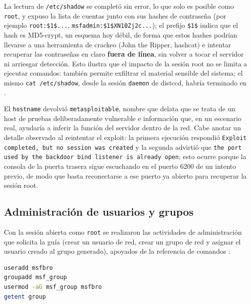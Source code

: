 \begin{analisis}
La lectura de \texttt{/etc/shadow} se completó sin error, lo que solo es posible como \texttt{root}, y expuso la lista de cuentas junto con sus hashes de contraseña (por ejemplo \texttt{root:\$1\$...}, \texttt{msfadmin:\$1\$XN10Zj2c...}); el prefijo \texttt{\$1\$} indica que el hash es MD5-crypt, un esquema hoy débil, de forma que estos hashes podrían llevarse a una herramienta de crackeo (John the Ripper, hashcat) e intentar recuperar las contraseñas en claro \textbf{fuera de línea}, sin volver a tocar el servidor ni arriesgar detección. Esto ilustra que el impacto de la sesión root no se limita a ejecutar comandos: también permite exfiltrar el material sensible del sistema; el mismo \texttt{cat /etc/shadow}, desde la sesión \texttt{daemon} de distccd, habría terminado en .
\end{analisis}


\begin{analisis}
El \texttt{hostname} devolvió \texttt{metasploitable}, nombre que delata que se trata de un host de pruebas deliberadamente vulnerable e información que, en un escenario real, ayudaría a inferir la función del servidor dentro de la red. Cabe anotar un detalle observado al reintentar el exploit: la primera ejecución respondió \texttt{Exploit completed, but no session was created} y la segunda advirtió que \texttt{the port used by the backdoor bind listener is already open}; esto ocurre porque la consola de la puerta trasera sigue escuchando en el puerto 6200 de un intento previo, de modo que basta reconectarse a ese puerto ya abierto para recuperar la sesión root.
\end{analisis}

\subsection{Administración de usuarios y grupos}

Con la sesión abierta como \texttt{root} se realizaron las actividades de administración que solicita la guía (crear un usuario de red, crear un grupo de red y asignar el usuario creado al grupo generado), apoyados de la referencia de comandos \cite{intef-usuarios}:

\begin{lstlisting}[language=bash]
useradd msfbro
groupadd msf_group
usermod -aG msf_group msfbro
getent group
\end{lstlisting}

